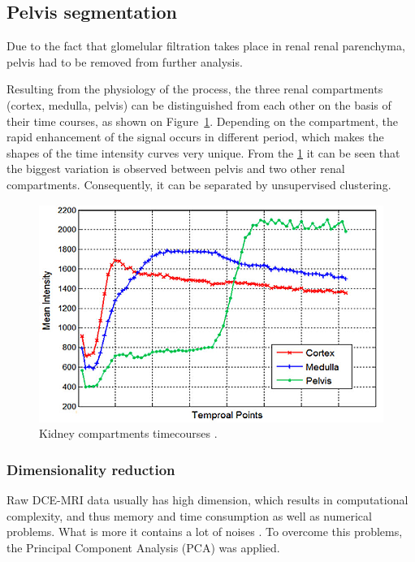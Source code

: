 \subsection{Pelvis segmentation}
\label{subsec:pelvis}
Due to the fact that glomelular filtration takes place in renal renal parenchyma, pelvis had to be removed from further analysis. 

Resulting from the physiology of the process, the three renal compartments (cortex, medulla, pelvis) can be distinguished from each other on the basis of their time courses, as shown on Figure~\ref{fig:timecourses}. Depending on the compartment, the rapid enhancement of the signal occurs in different period, which makes the shapes of the time intensity curves very unique.
From the \ref{fig:timecourses} it can be seen that the biggest variation is observed between pelvis and two other renal compartments.    Consequently, it can be separated by unsupervised clustering. 

\begin{figure}[H]
	\centering
	\includegraphics[width = \columnwidth]{img/timecourses}
	\caption{Kidney compartments timecourses  \cite{KidneySubsegmentation}.}
	\label{fig:timecourses}
\end{figure}
 
\subsubsection{Dimensionality reduction}
Raw DCE-MRI data usually has high dimension, which results in computational complexity, and thus memory and time consumption as well as numerical problems. What is more it contains a lot of noises \cite{KidneySubsegmentation}. To overcome this problems, the Principal Component Analysis (PCA) \cite{wold1987principal} was applied.

